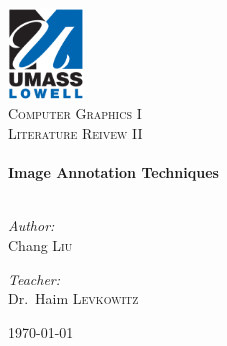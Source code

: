 \begin{titlepage}

\begin{center}


\includegraphics[width=0.15\textwidth]{./uml_logo}\\[5cm]    

\textsc{\LARGE Computer Graphics I}\\[1.5cm]

\textsc{\Large Literature Reivew II}\\[0.5cm]


\HRule \\[0.4cm]
{ \huge \bfseries Image Annotation Techniques}\\[0.4cm]

\HRule \\[1.5cm]

\begin{minipage}{0.4\textwidth}
\begin{flushleft} \large
\emph{Author:}\\
Chang \textsc{Liu}
\end{flushleft}
\end{minipage}
\begin{minipage}{0.4\textwidth}
\begin{flushright} \large
\emph{Teacher:} \\
Dr.~Haim \textsc{Levkowitz}
\end{flushright}
\end{minipage}

\vfill

{\large \today}

\end{center}

\end{titlepage}